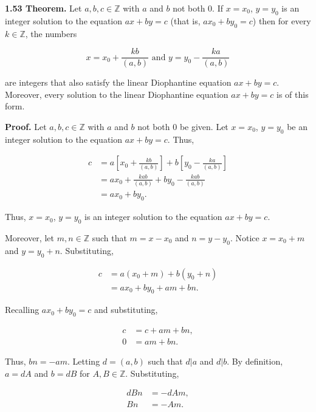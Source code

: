 \documentclass[12pt]{article}
\begin{document}
\noindent\textbf{1.53 Theorem.} Let $a,b,c\in\mathbb{Z}$ with $a$ and $b$ not both 0. If $x=x_{0}$, $y=y_{0}$ is an integer solution to the equation $ax+by=c$ (that is, $ax_{0}+by_{0}=c$) then for every $k\in\mathbb{Z}$, the numbers

\begin{equation*}
x = x_{0} + \frac{kb}{(a,b)} \text{ and } y = y_{0} - \frac{ka}{(a,b)}
\end{equation*}

\noindent are integers that also satisfy the linear Diophantine equation $ax+by=c$. Moreover, every solution to the linear Diophantine equation $ax+by=c$ is of this form.

\bigskip

\noindent\textbf{Proof.} Let $a,b,c\in\mathbb{Z}$ with $a$ and $b$ not both 0 be given. Let $x=x_{0}$, $y=y_{0}$ be an integer solution to the equation $ax+by=c$. Thus,

\begin{align*}
c &= a\left[x_{0} + \frac{kb}{(a,b)} \right] + b\left[y_{0} - \frac{ka}{(a,b)} \right] \\
&= ax_{0} + \frac{kab}{(a,b)} + by_{0} - \frac{kab}{(a,b)} \\
&= ax_{0}+by_{0}.
\end{align*}

\noindent Thus, $x=x_{0}$, $y=y_{0}$ is an integer solution to the equation $ax+by=c$.

\bigskip

\noindent Moreover, let $m,n\in\mathbb{Z}$ such that $m=x-x_{0}$ and $n=y-y_{0}$. Notice $x=x_{0}+m$ and $y=y_{0}+n$. Substituting,

\begin{align*}
c &= a(x_{0}+m) + b(y_{0}+n) \\
&= ax_{0} + by_{0} + am + bn.
\end{align*}

\noindent Recalling $ax_{0}+by_{0}=c$ and substituting,

\begin{align*}
c &= c + am + bn, \\
0 &= am + bn.
\end{align*}

\noindent Thus, $bn= -am$. Letting $d=(a,b)$ such that $d|a$ and $d|b$. By definition, $a=dA$ and $b=dB$ for $A,B\in\mathbb{Z}$. Substituting,

\begin{align*}
dBn &= -dAm, \\
Bn &= -Am.
\end{align*}
\end{document}

